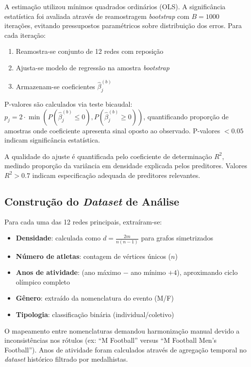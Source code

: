 A estimação utilizou mínimos quadrados ordinários (OLS). A significância estatística foi avaliada através de reamostragem \textit{bootstrap} com $B = 1000$ iterações, evitando pressupostos paramétricos sobre distribuição dos erros. Para cada iteração:

\begin{enumerate}
    \item Reamostra-se conjunto de 12 redes com reposição
    \item Ajusta-se modelo de regressão na amostra \textit{bootstrap}
    \item Armazenam-se coeficientes $\hat{\beta}_j^{(b)}$
\end{enumerate}

P-valores são calculados via teste bicaudal: $p_j = 2 \cdot \min(P(\hat{\beta}_j^{(b)} \leq 0), P(\hat{\beta}_j^{(b)} \geq 0))$, quantificando proporção de amostras onde coeficiente apresenta sinal oposto ao observado. P-valores $< 0.05$ indicam significância estatística.

A qualidade do ajuste é quantificada pelo coeficiente de determinação $R^2$, medindo proporção da variância em densidade explicada pelos preditores. Valores $R^2 > 0.7$ indicam especificação adequada de preditores relevantes.

\subsection{Construção do \textit{Dataset} de Análise}

Para cada uma das 12 redes principais, extraíram-se:

\begin{itemize}
    \item \textbf{Densidade}: calculada como $d = \frac{2m}{n(n-1)}$ para grafos simetrizados
    \item \textbf{Número de atletas}: contagem de vértices únicos ($n$)
    \item \textbf{Anos de atividade}: (ano máximo $-$ ano mínimo $+ 4$), aproximando ciclo olímpico completo
    \item \textbf{Gênero}: extraído da nomenclatura do evento (M/F)
    \item \textbf{Tipologia}: classificação binária (individual/coletivo)
\end{itemize}

O mapeamento entre nomenclaturas demandou harmonização manual devido a inconsistências nos rótulos (ex: ``M Football'' versus ``M Football Men's Football''). Anos de atividade foram calculados através de agregação temporal no \textit{dataset} histórico filtrado por medalhistas.

